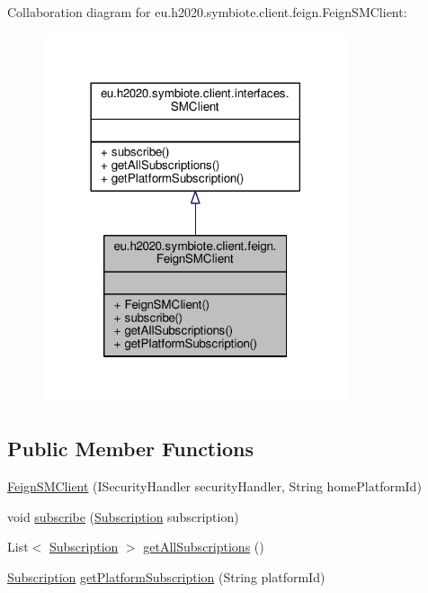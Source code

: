 Collaboration diagram for eu.\+h2020.\+symbiote.\+client.\+feign.\+Feign\+S\+M\+Client\+:
\nopagebreak
\begin{figure}[H]
\begin{center}
\leavevmode
\includegraphics[width=254pt]{classeu_1_1h2020_1_1symbiote_1_1client_1_1feign_1_1FeignSMClient__coll__graph}
\end{center}
\end{figure}
\subsection*{Public Member Functions}
\begin{DoxyCompactItemize}
\item 
\hyperlink{classeu_1_1h2020_1_1symbiote_1_1client_1_1feign_1_1FeignSMClient_a6d4f54ee587c930e8ad45093b4cceec7}{Feign\+S\+M\+Client} (I\+Security\+Handler security\+Handler, String home\+Platform\+Id)
\item 
void \hyperlink{classeu_1_1h2020_1_1symbiote_1_1client_1_1feign_1_1FeignSMClient_a0eeaef7f9775704b578f5d3101f28b1f}{subscribe} (\hyperlink{classeu_1_1h2020_1_1symbiote_1_1cloud_1_1model_1_1internal_1_1Subscription}{Subscription} subscription)
\item 
List$<$ \hyperlink{classeu_1_1h2020_1_1symbiote_1_1cloud_1_1model_1_1internal_1_1Subscription}{Subscription} $>$ \hyperlink{classeu_1_1h2020_1_1symbiote_1_1client_1_1feign_1_1FeignSMClient_a1a7e9bd000f939df425066692a5ccca4}{get\+All\+Subscriptions} ()
\item 
\hyperlink{classeu_1_1h2020_1_1symbiote_1_1cloud_1_1model_1_1internal_1_1Subscription}{Subscription} \hyperlink{classeu_1_1h2020_1_1symbiote_1_1client_1_1feign_1_1FeignSMClient_a6d8bf2b5d12dcd5db1239f376cd93365}{get\+Platform\+Subscription} (String platform\+Id)
\end{DoxyCompactItemize}


